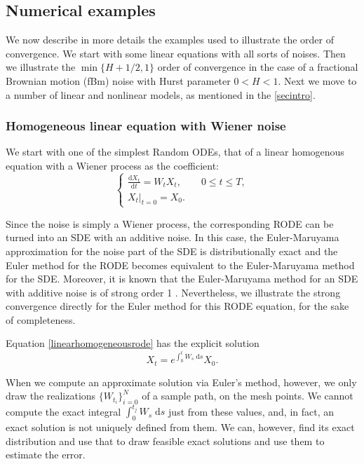 \documentclass[reqno,12pt]{amsart}
\theoremstyle{plain} %
\theoremstyle{definition} %
\begin{document}
\subsection{Numerical examples}
\label{secnumericalexamples}

We now describe in more details the examples used to illustrate the order of convergence. We start with some linear equations with all sorts of noises. Then we illustrate the $\min\{H + 1/2, 1\}$ order of convergence in the case of a fractional Brownian motion (fBm) noise with Hurst parameter $0 < H < 1.$ Next we move to a number of linear and nonlinear models, as mentioned in the \cref{secintro}.

\subsubsection{Homogeneous linear equation with Wiener noise}
\label{seclinearhomogeneousrode}

We start with one of the simplest Random ODEs, that of a linear homogenous equation with a Wiener process as the coefficient:
\begin{equation}
    \label{linearhomogeneousrode}
    \begin{cases}
        \displaystyle \frac{\mathrm{d}X_t}{\mathrm{d} t} = W_t X_t, \qquad 0 \leq t \leq T, \\
        \left. X_t \right|_{t = 0} = X_0.
      \end{cases}
\end{equation}

Since the noise is simply a Wiener process, the corresponding RODE can be turned into an SDE with an additive noise. In this case, the Euler-Maruyama approximation for the noise part of the SDE is distributionally exact and the Euler method for the RODE becomes equivalent to the Euler-Maruyama method for the SDE. Moreover, it is known that the Euler-Maruyama method for an SDE with additive noise is of strong order 1 \cite{HighamKloeden2021}. Nevertheless, we illustrate the strong convergence directly for the Euler method for this RODE equation, for the sake of completeness.

Equation \cref{linearhomogeneousrode} has the explicit solution
\begin{equation}
    \label{Xtlinearhomogeneousrodesolution}
    X_t = e^{\int_0^t W_s \;\mathrm{d}s}X_0.
\end{equation}

When we compute an approximate solution via Euler's method, however, we only draw the realizations $\{W_{t_i}\}_{i=0}^N$ of a sample path, on the mesh points. We cannot compute the exact integral $\int_0^{t_j} W_s\;\mathrm{d}s$ just from these values, and, in fact, an exact solution is not uniquely defined from them. We can, however, find its exact distribution and use that to draw feasible exact solutions and use them to estimate the error.
\end{document}
